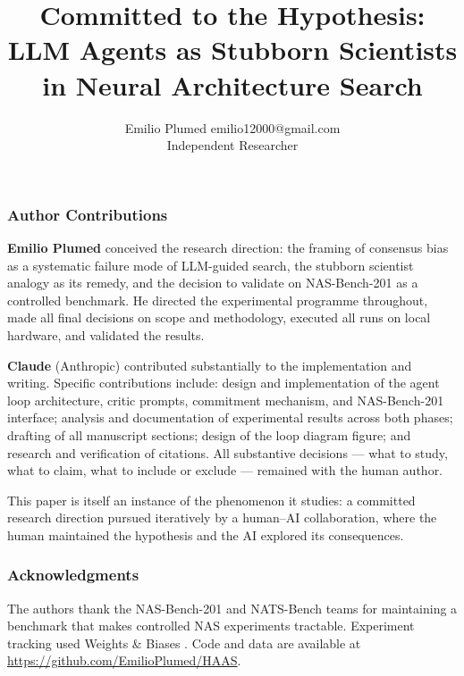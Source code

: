 \documentclass[10pt]{article}
\title{Committed to the Hypothesis: LLM Agents as Stubborn Scientists\\
       in Neural Architecture Search}
\author{\name Emilio Plumed \email emilio12000@gmail.com \\
      \addr Independent Researcher}
\begin{document}


\subsubsection*{Author Contributions}

\textbf{Emilio Plumed} conceived the research direction: the framing of consensus
bias as a systematic failure mode of LLM-guided search, the stubborn scientist
analogy as its remedy, and the decision to validate on NAS-Bench-201 as a
controlled benchmark. He directed the experimental programme throughout, made
all final decisions on scope and methodology, executed all runs on local
hardware, and validated the results.

\textbf{Claude} (Anthropic) contributed substantially to the implementation and
writing. Specific contributions include: design and implementation of the agent
loop architecture, critic prompts, commitment mechanism, and NAS-Bench-201
interface; analysis and documentation of experimental results across both phases;
drafting of all manuscript sections; design of the loop diagram figure; and
research and verification of citations. All substantive decisions --- what to
study, what to claim, what to include or exclude --- remained with the human
author.

This paper is itself an instance of the phenomenon it studies: a committed
research direction pursued iteratively by a human--AI collaboration, where the
human maintained the hypothesis and the AI explored its consequences.

\subsubsection*{Acknowledgments}

The authors thank the NAS-Bench-201 and NATS-Bench teams
\citep{dong2020nasbench201, dong2021nats} for maintaining a benchmark that makes
controlled NAS experiments tractable. Experiment tracking used Weights \& Biases
\citep{wandb}. Code and data are available at
\url{https://github.com/EmilioPlumed/HAAS}.




\appendix


\end{document}
